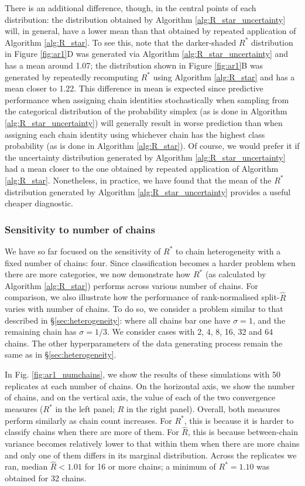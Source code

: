 \documentclass{article}
\begin{document}
There is an additional difference, though, in the central points of each distribution: the distribution obtained by Algorithm \ref{alg:R_star_uncertainty} will, in general, have a lower mean than that obtained by repeated application of Algorithm \ref{alg:R_star}. To see this, note that the darker-shaded $R^*$ distribution in Figure \ref{fig:ar1}D was generated via Algorithm \ref{alg:R_star_uncertainty} and has a mean around 1.07; the distribution shown in Figure \ref{fig:ar1}B was generated by repeatedly recomputing $R^*$ using Algorithm \ref{alg:R_star} and has a mean closer to 1.22. This difference in mean is expected since predictive performance when assigning chain identities stochastically when sampling from the categorical distribution of the probability simplex (as is done in Algorithm \ref{alg:R_star_uncertainty}) will generally result in worse prediction than when assigning each chain identity using whichever chain has the highest class probability (as is done in Algorithm \ref{alg:R_star}). Of course, we would prefer it if the uncertainty distribution generated by Algorithm \ref{alg:R_star_uncertainty} had a mean closer to the one obtained by repeated application of Algorithm \ref{alg:R_star}. Nonetheless, in practice, we have found that the mean of the $R^*$ distribution generated by Algorithm \ref{alg:R_star_uncertainty} provides a useful cheaper diagnostic.

\subsubsection{Sensitivity to number of chains}\label{sec:heterogeneity_numchains}
We have so far focused on the sensitivity of $R^*$ to chain heterogeneity with a fixed number of chains: four. Since classification becomes a harder problem when there are more categories, we now demonstrate how $R^*$ (as calculated by Algorithm \ref{alg:R_star}) performs across various number of chains. For comparison, we also illustrate how the performance of rank-normalised split-$\widehat{R}$ varies with number of chains. To do so, we consider a problem similar to that described in \S\ref{sec:heterogeneity}: where all chains bar one have $\sigma=1$, and the remaining chain has $\sigma=1/3$. We consider cases with 2, 4, 8, 16, 32 and 64 chains. The other hyperparameters of the data generating process remain the same as in \S\ref{sec:heterogeneity}.

In Fig. \ref{fig:ar1_numchains}, we show the results of these simulations with 50 replicates at each number of chains. On the horizontal axis, we show the number of chains, and on the vertical axis, the value of each of the two convergence measures ($R^*$ in the left panel; $\widehat{R}$ in the right panel). Overall, both measures perform similarly as chain count increases. For $R^*$, this is because it is harder to classify chains when there are more of them. For $\widehat{R}$, this is because between-chain variance becomes relatively lower to that within them when there are more chains and only one of them differs in its marginal distribution. Across the replicates we ran, median $\widehat{R}<1.01$ for 16 or more chains; a minimum of $R^*=1.10$ was obtained for 32 chains.
\end{document}
